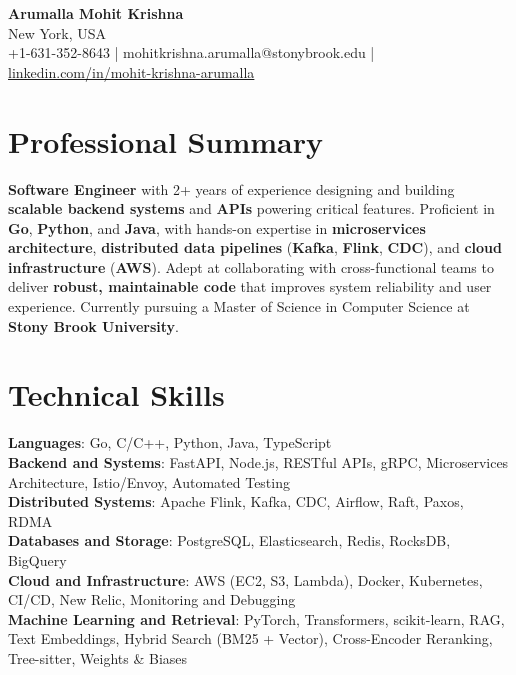 \documentclass[letterpaper,11pt]{article}
\begin{document}
\begin{center}
  {\Large \textbf{Arumalla Mohit Krishna}} \\
  New York, USA \\
  +1-631-352-8643 \enspace | \enspace mohitkrishna.arumalla@stonybrook.edu \enspace | \enspace \href{https://www.linkedin.com/in/mohit-krishna-arumalla}{linkedin.com/in/mohit-krishna-arumalla}
\end{center}

\section{Professional Summary}
  \begin{itemize}[leftmargin=0.15in, label={}]
    \small{\item{
     \textbf{Software Engineer} with 2+ years of experience designing and building \textbf{scalable backend systems} and \textbf{APIs} powering critical features. Proficient in \textbf{Go}, \textbf{Python}, and \textbf{Java}, with hands-on expertise in \textbf{microservices architecture}, \textbf{distributed data pipelines} (\textbf{Kafka}, \textbf{Flink}, \textbf{CDC}), and \textbf{cloud infrastructure} (\textbf{AWS}). Adept at collaborating with cross-functional teams to deliver \textbf{robust, maintainable code} that improves system reliability and user experience. Currently pursuing a Master of Science in Computer Science at \textbf{Stony Brook University}.
    }}
  \end{itemize}
\vspace{-16pt}

\section{Technical Skills}
 \begin{itemize}[leftmargin=0.15in, label={}]
    \small{\item{
     \textbf{Languages}: Go, C/C++, Python, Java, TypeScript \\
     \textbf{Backend and Systems}: FastAPI, Node.js, RESTful APIs, gRPC, Microservices Architecture, Istio/Envoy, Automated Testing \\
     \textbf{Distributed Systems}: Apache Flink, Kafka, CDC, Airflow, Raft, Paxos, RDMA \\
     \textbf{Databases and Storage}: PostgreSQL, Elasticsearch, Redis, RocksDB, BigQuery \\
     \textbf{Cloud and Infrastructure}: AWS (EC2, S3, Lambda), Docker, Kubernetes, CI/CD, New Relic, Monitoring and Debugging \\
     \textbf{Machine Learning and Retrieval}: PyTorch, Transformers, scikit-learn, RAG, Text Embeddings, Hybrid Search (BM25 + Vector), Cross-Encoder Reranking, Tree-sitter, Weights \& Biases
    }}
 \end{itemize}
\vspace{-16pt}
\end{document}
